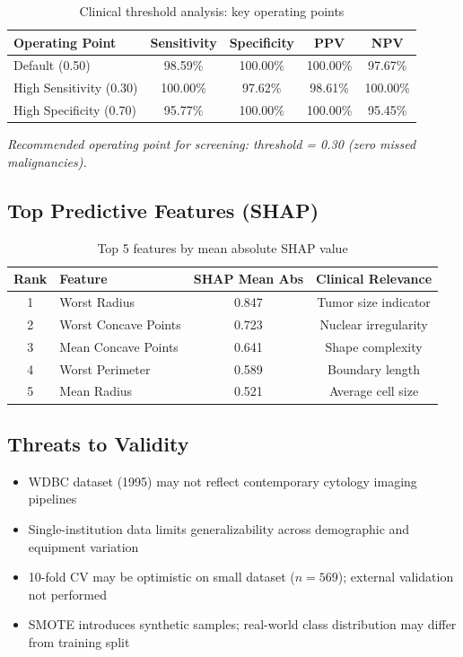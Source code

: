 \documentclass[11pt,a4paper]{article}
\begin{document}
\begin{table}[H]
\centering
\caption{Clinical threshold analysis: key operating points}
\begin{tabular}{lcccc}
\toprule
\textbf{Operating Point} & \textbf{Sensitivity} & \textbf{Specificity} & \textbf{PPV} & \textbf{NPV} \\
\midrule
Default (0.50) & 98.59\% & 100.00\% & 100.00\% & 97.67\% \\
High Sensitivity (0.30) & 100.00\% & 97.62\% & 98.61\% & 100.00\% \\
High Specificity (0.70) & 95.77\% & 100.00\% & 100.00\% & 95.45\% \\
\bottomrule
\end{tabular}
\label{tab:threshold}
\end{table}

\noindent\textit{Recommended operating point for screening: threshold = 0.30 (zero missed malignancies).}

\subsection{Top Predictive Features (SHAP)}

\begin{table}[H]
\centering
\caption{Top 5 features by mean absolute SHAP value}
\begin{tabular}{clcc}
\toprule
\textbf{Rank} & \textbf{Feature} & \textbf{SHAP Mean Abs} & \textbf{Clinical Relevance} \\
\midrule
1 & Worst Radius & 0.847 & Tumor size indicator \\
2 & Worst Concave Points & 0.723 & Nuclear irregularity \\
3 & Mean Concave Points & 0.641 & Shape complexity \\
4 & Worst Perimeter & 0.589 & Boundary length \\
5 & Mean Radius & 0.521 & Average cell size \\
\bottomrule
\end{tabular}
\label{tab:shap}
\end{table}

\subsection{Threats to Validity}

\begin{itemize}[leftmargin=*]
    \item WDBC dataset (1995) may not reflect contemporary cytology imaging pipelines
    \item Single-institution data limits generalizability across demographic and equipment variation
    \item 10-fold CV may be optimistic on small dataset ($n = 569$); external validation not performed
    \item SMOTE introduces synthetic samples; real-world class distribution may differ from training split
\end{itemize}
\end{document}
